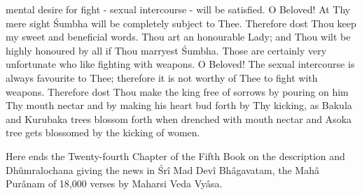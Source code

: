 mental desire for fight - sexual intercourse - will be satisfied. O Beloved! At Thy mere sight \'Sumbha will be completely subject to Thee. Therefore dost Thou keep my sweet and beneficial words. Thou art an honourable Lady; and Thou wilt be highly honoured by all if Thou marryest \'Sumbha. Those are certainly very unfortunate who like fighting with weapons. O Beloved! The sexual intercourse is always favourite to Thee; therefore it is not worthy of Thee to fight with weapons. Therefore dost Thou make the king free of sorrows by pouring on him Thy mouth nectar and by making his heart bud forth by Thy kicking, as Bakula and Kurubaka trees blossom forth when drenched with mouth nectar and Asoka tree gets blossomed by the kicking of women.

Here ends the Twenty-fourth Chapter of the Fifth Book on the description and Dh\^umralochana giving the news in \'Sr\^i Mad Dev\^i Bh\^agavatam, the Mah\^a Pur\^anam of 18,000 verses by Maharsi Veda Vy\^asa.

